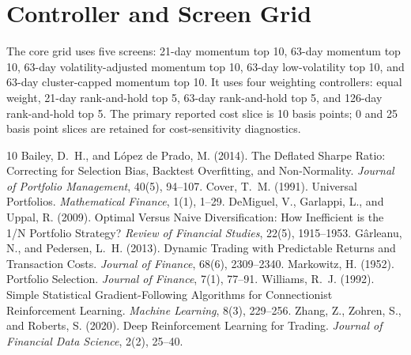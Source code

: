 \documentclass[11pt,a4paper]{article}
\begin{document}
\section{Controller and Screen Grid}
The core grid uses five screens: 21-day momentum top 10, 63-day momentum top 10, 63-day volatility-adjusted momentum top 10, 63-day low-volatility top 10, and 63-day cluster-capped momentum top 10. It uses four weighting controllers: equal weight, 21-day rank-and-hold top 5, 63-day rank-and-hold top 5, and 126-day rank-and-hold top 5. The primary reported cost slice is 10 basis points; 0 and 25 basis point slices are retained for cost-sensitivity diagnostics.


\sloppy
\begin{thebibliography}{10}
 Bailey, D.~H., and L{\'o}pez de Prado, M. (2014). The Deflated Sharpe Ratio: Correcting for Selection Bias, Backtest Overfitting, and Non-Normality. \textit{Journal of Portfolio Management}, 40(5), 94--107.
 Cover, T.~M. (1991). Universal Portfolios. \textit{Mathematical Finance}, 1(1), 1--29.
 DeMiguel, V., Garlappi, L., and Uppal, R. (2009). Optimal Versus Naive Diversification: How Inefficient is the 1/N Portfolio Strategy? \textit{Review of Financial Studies}, 22(5), 1915--1953.
 G{\^a}rleanu, N., and Pedersen, L.~H. (2013). Dynamic Trading with Predictable Returns and Transaction Costs. \textit{Journal of Finance}, 68(6), 2309--2340.
 Markowitz, H. (1952). Portfolio Selection. \textit{Journal of Finance}, 7(1), 77--91.
 Williams, R.~J. (1992). Simple Statistical Gradient-Following Algorithms for Connectionist Reinforcement Learning. \textit{Machine Learning}, 8(3), 229--256.
 Zhang, Z., Zohren, S., and Roberts, S. (2020). Deep Reinforcement Learning for Trading. \textit{Journal of Financial Data Science}, 2(2), 25--40.
\end{thebibliography}
\end{document}
